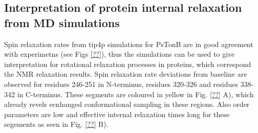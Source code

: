 \documentclass[pre,aps,floatfix,authordate1-4,twocolumn]{revtex4-1}
\begin{document}



\subsection{Interpretation of protein internal relaxation from MD simulations}
Spin relaxation rates from tip4p simulations for PsTonB are in good agreement with
experimetns (see Figs \ref{??}), thus the simulations can be used to give interpretation
for rotational relaxation processes in proteins, which correspond the
NMR relaxation results. Spin relaxation rate deviations from baseline
are observed for residues 246-251 in N-terminus, residues 320-326
and residues 338-342 in C-terminus. These segments are coloured in yellow
in Fig. \ref{??} A), which already revels ecnhanged conformational sampling
in these regions. Also order parameters are low and effective internal
relaxation times long for these segements as seen in Fig. \ref{??} B).
\end{document}

